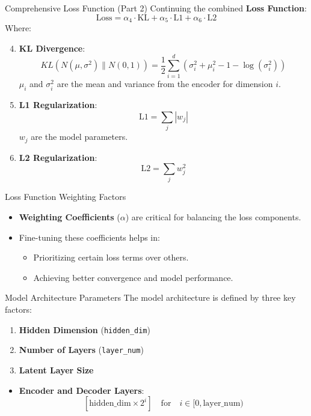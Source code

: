 \documentclass[9pt]{beamer}
\begin{document}
\begin{frame}{Comprehensive Loss Function (Part 2)}
  Continuing the combined \textbf{Loss Function}:
  \[
  \text{Loss} = \alpha_4 \cdot \text{KL} + \alpha_5 \cdot \text{L1} + \alpha_6 \cdot \text{L2}
  \]
  Where:
  \begin{enumerate}
    \setcounter{enumi}{3} %
    \item \textbf{KL Divergence}:
      \[
      KL(N(\mu, \sigma^2) \parallel N(0, 1)) = \frac{1}{2} \sum_{i=1}^{d} \left( \sigma_i^2 + \mu_i^2 - 1 - \log(\sigma_i^2) \right)
      \]
      \( \mu_i \) and \( \sigma_i^2 \) are the mean and variance from the encoder for dimension \( i \).
    \item \textbf{L1 Regularization}:
      \[
      \text{L1} = \sum_{j} |w_j|
      \]
      \( w_j \) are the model parameters.
    \item \textbf{L2 Regularization}:
      \[
      \text{L2} = \sum_{j} w_j^2
      \]
  \end{enumerate}
\end{frame}

\begin{frame}{Loss Function Weighting Factors}
  \begin{itemize}
    \item \textbf{Weighting Coefficients} (\( \alpha \)) are critical for balancing the loss components.
    \item Fine-tuning these coefficients helps in:
    \begin{itemize}
      \item Prioritizing certain loss terms over others.
      \item Achieving better convergence and model performance.
    \end{itemize}
  \end{itemize}
\end{frame}




\begin{frame}{Model Architecture Parameters}
  The model architecture is defined by three key factors:
  \begin{enumerate}
    \item \textbf{Hidden Dimension} (\texttt{hidden\_dim})
    \item \textbf{Number of Layers} (\texttt{layer\_num})
    \item \textbf{Latent Layer Size}
  \end{enumerate}
  \begin{itemize}
    \item \textbf{Encoder and Decoder Layers}:
    \[
    [ \text{hidden\_dim} \times 2^i ] \quad \text{for} \quad i \in [0, \text{layer\_num})
    \]
  \end{itemize}
\end{frame}
\end{document}
